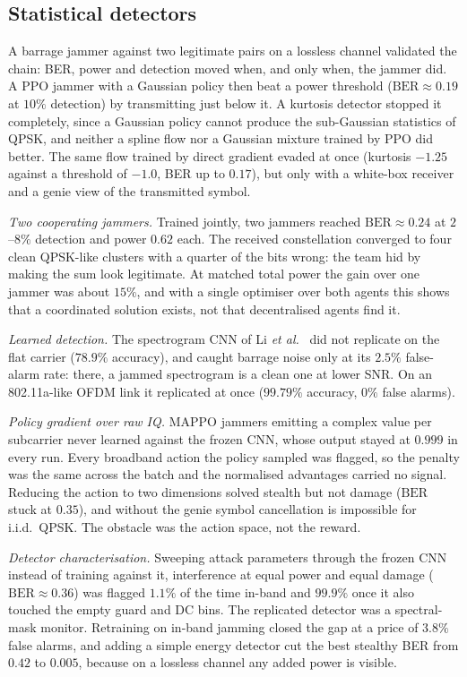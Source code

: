 \subsection{Statistical detectors}
A barrage jammer against two legitimate pairs on a lossless channel validated the chain: BER, power and
detection moved when, and only when, the jammer did.
A PPO jammer with a Gaussian policy then beat a power threshold ($\mathrm{BER} \approx 0.19$ at
$10\%$ detection) by transmitting just below it.
A kurtosis detector stopped it completely, since a Gaussian policy cannot produce the sub-Gaussian
statistics of QPSK, and neither a spline flow nor a Gaussian mixture trained by PPO did better.
The same flow trained by direct gradient evaded at once (kurtosis $-1.25$ against a threshold of
$-1.0$, BER up to $0.17$), but only with a white-box receiver and a genie view of the transmitted
symbol.

\textit{Two cooperating jammers.}
Trained jointly, two jammers reached $\mathrm{BER} \approx 0.24$ at $2$--$8\%$ detection and power
$0.62$ each.
The received constellation converged to four clean QPSK-like clusters with a quarter of the bits
wrong: the team hid by making the sum look legitimate.
At matched total power the gain over one jammer was about $15\%$, and with a single optimiser over
both agents this shows that a coordinated solution exists, not that decentralised agents find it.

\textit{Learned detection.}
The spectrogram CNN of Li \emph{et al.}~\cite{9707819} did not replicate on the flat carrier
($78.9\%$ accuracy), and caught barrage noise only at its $2.5\%$ false-alarm rate: there, a jammed
spectrogram is a clean one at lower SNR.
On an 802.11a-like OFDM link it replicated at once ($99.79\%$ accuracy, $0\%$ false alarms).

\textit{Policy gradient over raw IQ.}
MAPPO jammers emitting a complex value per subcarrier never learned against the frozen CNN, whose
output stayed at $0.999$ in every run.
Every broadband action the policy sampled was flagged, so the penalty was the same across the batch
and the normalised advantages carried no signal.
Reducing the action to two dimensions solved stealth but not damage ($\mathrm{BER}$ stuck at $0.35$),
and without the genie symbol cancellation is impossible for i.i.d.\ QPSK.
The obstacle was the action space, not the reward.

\textit{Detector characterisation.}
Sweeping attack parameters through the frozen CNN instead of training against it, interference at
equal power and equal damage ($\mathrm{BER} \approx 0.36$) was flagged $1.1\%$ of the time in-band and
$99.9\%$ once it also touched the empty guard and DC bins.
The replicated detector was a spectral-mask monitor.
Retraining on in-band jamming closed the gap at a price of $3.8\%$ false alarms, and adding a simple
energy detector cut the best stealthy BER from $0.42$ to $0.005$, because on a lossless channel any
added power is visible.

